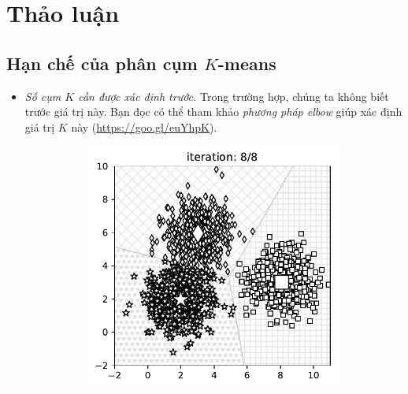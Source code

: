 \section{Thảo luận}
\subsection{Hạn chế của phân cụm $K$-means}


\begin{itemize}
    \item \textit{Số cụm $K$ cần được xác định trước.}
    Trong trường hợp, chúng ta không biết trước giá trị này. Bạn đọc có thể tham khảo \textit{phương pháp elbow} giúp xác định giá trị $K$ này (\url{https://goo.gl/euYhpK}).
    \begin{figure}[t]
        \begin{subfigure}{0.325\textwidth}
        \includegraphics[width=0.99\linewidth]{ebookML_src/src/kmeans/dif_res10.pdf}
        \caption{}
        \label{fig:4_dif_resa}
        \end{subfigure}
        \begin{subfigure}{0.325\textwidth}

\end{subfigure}
\end{figure}
\end{itemize}
